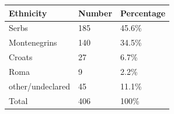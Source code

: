 \documentclass{article}
\begin{document}
\begin{tabular}{lll}
\toprule
Ethnicity & Number & Percentage \\
\midrule
Serbs & 185 & 45.6\% \\
Montenegrins & 140 & 34.5\% \\
Croats & 27 & 6.7\% \\
Roma & 9 & 2.2\% \\
other/undeclared & 45 & 11.1\% \\
Total & 406 & 100\% \\
\bottomrule
\end{tabular}
\end{document}
